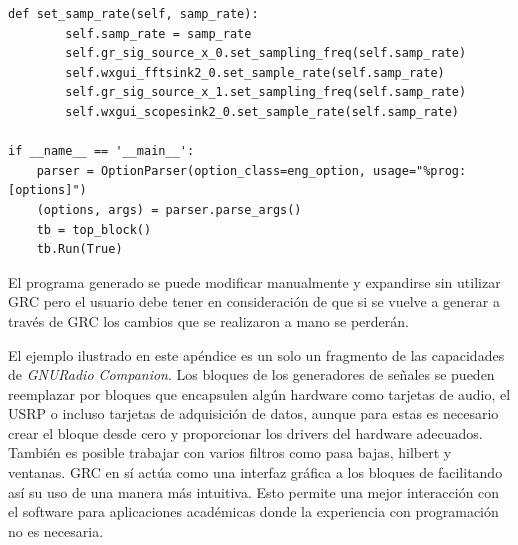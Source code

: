 \begin{lstlisting}[float=hp, label=ex:grcpython, caption={C\'odigo \emph{Python} generado por GRC}, breaklines=true]
	def set_samp_rate(self, samp_rate):
		self.samp_rate = samp_rate
		self.gr_sig_source_x_0.set_sampling_freq(self.samp_rate)
		self.wxgui_fftsink2_0.set_sample_rate(self.samp_rate)
		self.gr_sig_source_x_1.set_sampling_freq(self.samp_rate)
		self.wxgui_scopesink2_0.set_sample_rate(self.samp_rate)

if __name__ == '__main__':
	parser = OptionParser(option_class=eng_option, usage="%prog: [options]")
	(options, args) = parser.parse_args()
	tb = top_block()
	tb.Run(True)
\end{lstlisting}

El programa generado se puede modificar manualmente y expandirse sin utilizar GRC pero el usuario debe tener en consideraci\'on de
que si se vuelve a generar a trav\'es de GRC los cambios que se realizaron a mano se perder\'an.

El ejemplo ilustrado en este ap\'endice es un solo un fragmento de las capacidades de
\emph{GNURadio Companion}. Los bloques de los generadores de se\~nales se pueden reemplazar por
bloques que encapsulen alg\'un hardware como tarjetas de audio, el USRP o incluso tarjetas de
adquisici\'on de datos, aunque para estas es necesario crear el bloque desde cero y proporcionar los
drivers del hardware adecuados. Tambi\'en es posible trabajar con varios filtros como pasa bajas,
hilbert y ventanas. GRC en s\'i act\'ua como una interfaz gr\'afica a los bloques de \gnuradio
facilitando as\'i su uso de una manera m\'as intuitiva. Esto permite una mejor interacci\'on con el
software para aplicaciones acad\'emicas donde la experiencia con programaci\'on no es necesaria.
